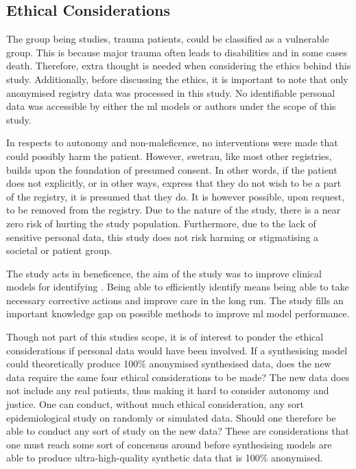 \documentclass[12pt, letterpaper]{article}
\begin{document}
\subsection{Ethical Considerations}
The group being studies, trauma patients, could be classified as a vulnerable group. This is because major trauma often leads to disabilities and in some cases death. Therefore, extra thought is needed when considering the ethics behind this study. Additionally, before discussing the ethics, it is important to note that only anonymised registry data was processed in this study. No identifiable personal data was accessible by either the \acrshort{ml} models or authors under the scope of this study.

In respects to autonomy and non-maleficence, no interventions were made that could possibly harm the patient. However, \acrshort{swetrau}, like most other registries, builds upon the foundation of presumed consent. In other words, if the patient does not explicitly, or in other ways, express that they do not wish to be a part of the registry, it is presumed that they do. It is however possible, upon request, to be removed from the registry. Due to the nature of the study, there is a near zero risk of hurting the study population. Furthermore, due to the lack of sensitive personal data, this study does not risk harming or stigmatising a societal or patient group.

The study acts in beneficence, the aim of the study was to improve clinical models for identifying . Being able to efficiently identify  means being able to take necessary corrective actions and improve care in the long run. The study fills an important knowledge gap on possible methods to improve \acrshort{ml} model performance.

Though not part of this studies scope, it is of interest to ponder the ethical considerations if personal data would have been involved. If a synthesising model could theoretically produce 100\% anonymised synthesised data, does the new data require the same four ethical considerations to be made? The new data does not include any real patients, thus making it hard to consider autonomy and justice. One can conduct, without much ethical consideration, any sort epidemiological study on randomly or simulated data. Should one therefore be able to conduct any sort of study on the new data? These are considerations that one must reach some sort of concensus around before synthesising models are able to produce ultra-high-quality synthetic data that is 100\% anonymised.
\end{document}

